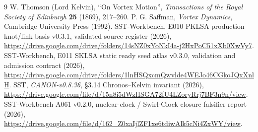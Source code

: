 \documentclass[10pt,a4paper]{article}
\begin{document}
\begin{thebibliography}{9}
 W. Thomson (Lord Kelvin), ``On Vortex Motion'', \emph{Transactions of the Royal Society of Edinburgh} \textbf{25} (1869), 217--260.
 P. G. Saffman, \emph{Vortex Dynamics}, Cambridge University Press (1992).
 SST-Workbench, E010 PKLSA production knot/link basis v0.3.1, validated source register (2026), \url{https://drive.google.com/drive/folders/14sNZ0xYoNkI4a-j2HxPoC51xXb0XwVy7}.
 SST-Workbench, E011 SKLSA static ready seed atlas v0.3.0, validation and admission contract (2026), \url{https://drive.google.com/drive/folders/1lnHSQxcmQwvlde4WEJo46CGkoJQxXnlH}.
 SST, \emph{CANON-v0.8.36}, \S3.14 Chronos--Kelvin invariant (2026), \url{https://drive.google.com/file/d/15n8i5dWzHSGA72fU4LZoryRrj7BF3n9n/view}.
 SST-Workbench A061 v0.2.0, nuclear-clock / Swirl-Clock closure falsifier report (2026), \url{https://drive.google.com/file/d/162_Z0xaIjlZF1xe6tdiwAlk5cNi4ZxWY/view}.
\end{thebibliography}
\end{document}
